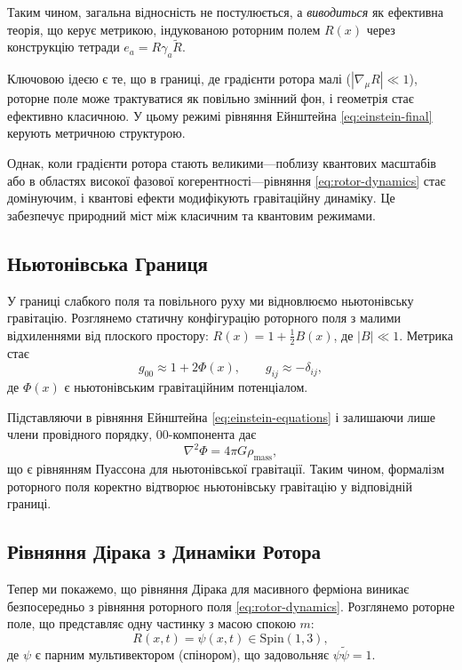 \documentclass[11pt,a4paper]{article}
\numberwithin{equation}{section}
\theoremstyle{plain}
\theoremstyle{definition}
\theoremstyle{remark}
\begin{document}
Таким чином, загальна відносність не постулюється, а \emph{виводиться} як ефективна теорія, що керує метрикою, індукованою роторним полем $R(x)$ через конструкцію тетради $e_a = R\gamma_a\widetilde{R}$.

Ключовою ідеєю є те, що в границі, де градієнти ротора малі ($|\nabla_\mu R| \ll 1$), роторне поле може трактуватися як повільно змінний фон, і геометрія стає ефективно класичною. У цьому режимі рівняння Ейнштейна \eqref{eq:einstein-final} керують метричною структурою.

Однак, коли градієнти ротора стають великими---поблизу квантових масштабів або в областях високої фазової когерентності---рівняння \eqref{eq:rotor-dynamics} стає домінуючим, і квантові ефекти модифікують гравітаційну динаміку. Це забезпечує природний міст між класичним та квантовим режимами.

\subsection{Ньютонівська Границя}

У границі слабкого поля та повільного руху ми відновлюємо ньютонівську гравітацію. Розглянемо статичну конфігурацію роторного поля з малими відхиленнями від плоского простору: $R(x) = 1 + \frac{1}{2}B(x)$, де $|B| \ll 1$. Метрика стає
\begin{equation}
g_{00} \approx 1 + 2\Phi(x), \qquad g_{ij} \approx -\delta_{ij},
\end{equation}
де $\Phi(x)$ є ньютонівським гравітаційним потенціалом.

Підставляючи в рівняння Ейнштейна \eqref{eq:einstein-equations} і залишаючи лише члени провідного порядку, $00$-компонента дає
\begin{equation}
\nabla^2 \Phi = 4\pi G \rho_{\mathrm{mass}},
\label{eq:poisson}
\end{equation}
що є рівнянням Пуассона для ньютонівської гравітації. Таким чином, формалізм роторного поля коректно відтворює ньютонівську гравітацію у відповідній границі.

\subsection{Рівняння Дірака з Динаміки Ротора}

Тепер ми покажемо, що рівняння Дірака для масивного ферміона виникає безпосередньо з рівняння роторного поля \eqref{eq:rotor-dynamics}. Розглянемо роторне поле, що представляє одну частинку з масою спокою $m$:
\begin{equation}
R(x,t) = \psi(x,t) \in \mathrm{Spin}(1,3),
\end{equation}
де $\psi$ є парним мультивектором (спінором), що задовольняє $\psi\widetilde{\psi} = 1$.
\end{document}
